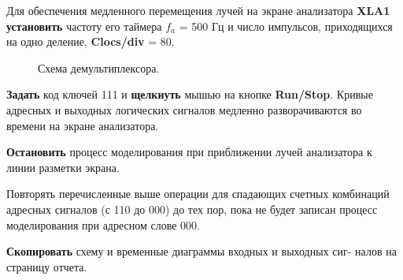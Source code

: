 \documentclass[spec, och, otchet, hidelinks]{SCWorks}
\begin{document}
\par Для обеспечения медленного перемещения лучей на экране анализатора
\textbf{XLA1 установить} частоту его таймера $ f_a $ = 500 Гц и число импульсов, 
приходящихся на одно деление, \textbf{Clocs/div} = 80.

\begin{figure}[h]
	\caption{Схема демультиплексора.}
\end{figure}

\par \textbf{Задать} код ключей 111 и \textbf{щелкнуть} мышью на кнопке \textbf{Run/Stop}. Кривые адресных
и выходных логических сигналов медленно разворачиваются во времени на экране анализатора.

\textbf{Остановить} процесс моделирования при приближении лучей анализатора к линии разметки экрана.

\par Повторять перечисленные выше операции для спадающих счетных комбинаций адресных сигналов (с 110 до 000) 
до тех пор, пока не будет записан процесс моделирования при адресном слове 000.

\newpage

\textbf{Скопировать} схему и временные диаграммы входных и выходных сиг-
налов на страницу отчета.
\end{document}
